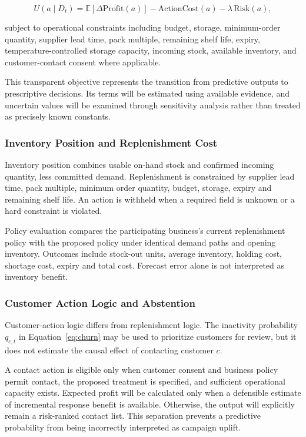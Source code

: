 \documentclass[a4paper,11pt,oneside]{book}
\theoremstyle{plain}
\theoremstyle{definition}
\theoremstyle{remark}
\begin{document}
\begin{equation}
U(a\mid D_t)
=
\mathbb{E}\!\left[\Delta\mathrm{Profit}(a)\right]
-
\mathrm{ActionCost}(a)
-
\lambda\,\mathrm{Risk}(a),
\label{eq:utility}
\end{equation}

subject to operational constraints including budget, storage, minimum-order
quantity, supplier lead time, pack multiple, remaining shelf life, expiry,
temperature-controlled storage capacity, incoming stock, available inventory, and customer-contact
consent where applicable.

This transparent objective represents the transition from predictive outputs to
prescriptive decisions. Its terms will be estimated using available evidence,
and uncertain values will be examined through sensitivity analysis rather than
treated as precisely known constants.


\subsubsection{Inventory Position and Replenishment Cost}
Inventory position combines usable on-hand stock and confirmed incoming
quantity, less committed demand. Replenishment is constrained by supplier
lead time, pack multiple, minimum order quantity, budget, storage, expiry
and remaining shelf life. An action is withheld when a required field is
unknown or a hard constraint is violated.

Policy evaluation compares the participating business's current replenishment
policy with the proposed policy under identical demand paths and opening inventory. Outcomes include stock-out units, average
inventory, holding cost, shortage cost, expiry and total cost. Forecast error
alone is not interpreted as inventory benefit.

\subsubsection{Customer Action Logic and Abstention}

Customer-action logic differs from replenishment logic. The inactivity
probability \(q_{c,t}\) in Equation~\ref{eq:churn} may be used to prioritize
customers for review, but it does not estimate the causal effect of contacting
customer \(c\).

A contact action is eligible only when customer consent and business policy
permit contact, the proposed treatment is specified, and sufficient operational
capacity exists. Expected profit will be calculated only when a defensible
estimate of incremental response benefit is available. Otherwise, the output
will explicitly remain a risk-ranked contact list. This separation prevents a
predictive probability from being incorrectly interpreted as campaign uplift.
\end{document}
